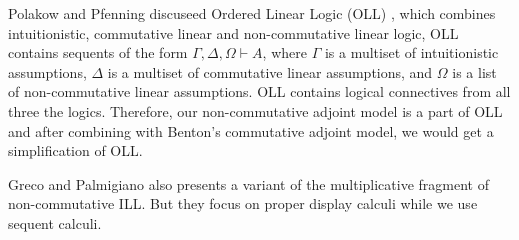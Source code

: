 Polakow and Pfenning discuseed Ordered Linear Logic (OLL) \cite{}, which combines
intuitionistic, commutative linear and non-commutative linear logic, OLL contains sequents of
the form $\Gamma,\Delta,\Omega\vdash A$, where $\Gamma$ is a multiset of intuitionistic
assumptions, $\Delta$ is a multiset of commutative linear assumptions, and $\Omega$ is a list of
non-commutative linear assumptions. OLL contains logical connectives from all three the logics.
Therefore, our non-commutative adjoint model is a part of OLL and after combining with Benton's
commutative adjoint model, we would get a simplification of OLL.

Greco and Palmigiano \cite{} also presents a variant of the multiplicative fragment of
non-commutative ILL. But they focus on proper display calculi while we use sequent calculi.
